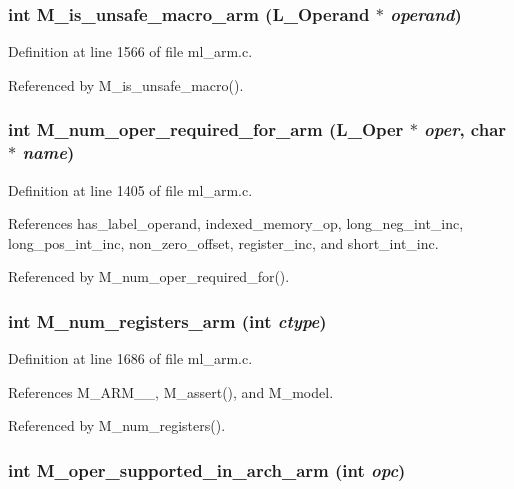 \subsubsection{\setlength{\rightskip}{0pt plus 5cm}int M\_\-is\_\-unsafe\_\-macro\_\-arm (L\_\-Operand $\ast$ {\em operand})}\label{m__arm_8h_c7f01812e4981b5a5c367e89aa8bbb44}




Definition at line 1566 of file ml\_\-arm.c.

Referenced by M\_\-is\_\-unsafe\_\-macro().
\subsubsection{\setlength{\rightskip}{0pt plus 5cm}int M\_\-num\_\-oper\_\-required\_\-for\_\-arm (L\_\-Oper $\ast$ {\em oper}, char $\ast$ {\em name})}\label{m__arm_8h_a4af2338b49e95ac3d2f46e4fef25d17}




Definition at line 1405 of file ml\_\-arm.c.

References has\_\-label\_\-operand, indexed\_\-memory\_\-op, long\_\-neg\_\-int\_\-inc, long\_\-pos\_\-int\_\-inc, non\_\-zero\_\-offset, register\_\-inc, and short\_\-int\_\-inc.

Referenced by M\_\-num\_\-oper\_\-required\_\-for().
\subsubsection{\setlength{\rightskip}{0pt plus 5cm}int M\_\-num\_\-registers\_\-arm (int {\em ctype})}\label{m__arm_8h_46f8873c38af373c04bf4ee93a988f21}




Definition at line 1686 of file ml\_\-arm.c.

References M\_\-ARM\_\_, M\_\-assert(), and M\_\-model.

Referenced by M\_\-num\_\-registers().
\subsubsection{\setlength{\rightskip}{0pt plus 5cm}int M\_\-oper\_\-supported\_\-in\_\-arch\_\-arm (int {\em opc})}\label{m__arm_8h_26978e7f9d7c87c011af90627774611d}




